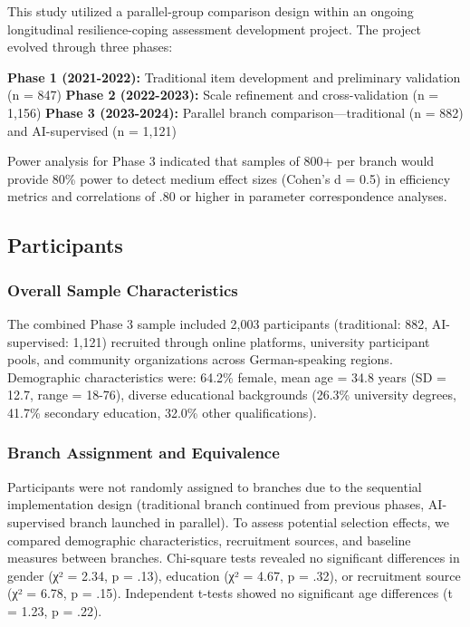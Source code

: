 \documentclass[12pt,a4paper]{article}
\begin{document}
This study utilized a parallel-group comparison design within an ongoing longitudinal resilience-coping assessment development project. The project evolved through three phases:

\textbf{Phase 1 (2021-2022):} Traditional item development and preliminary validation (n = 847)
\textbf{Phase 2 (2022-2023):} Scale refinement and cross-validation (n = 1,156) 
\textbf{Phase 3 (2023-2024):} Parallel branch comparison—traditional (n = 882) and AI-supervised (n = 1,121)

Power analysis for Phase 3 indicated that samples of 800+ per branch would provide 80\% power to detect medium effect sizes (Cohen's d = 0.5) in efficiency metrics and correlations of .80 or higher in parameter correspondence analyses.

\subsection{Participants}

\subsubsection{Overall Sample Characteristics}

The combined Phase 3 sample included 2,003 participants (traditional: 882, AI-supervised: 1,121) recruited through online platforms, university participant pools, and community organizations across German-speaking regions. Demographic characteristics were: 64.2\% female, mean age = 34.8 years (SD = 12.7, range = 18-76), diverse educational backgrounds (26.3\% university degrees, 41.7\% secondary education, 32.0\% other qualifications).

\subsubsection{Branch Assignment and Equivalence}

Participants were not randomly assigned to branches due to the sequential implementation design (traditional branch continued from previous phases, AI-supervised branch launched in parallel). To assess potential selection effects, we compared demographic characteristics, recruitment sources, and baseline measures between branches. Chi-square tests revealed no significant differences in gender (χ² = 2.34, p = .13), education (χ² = 4.67, p = .32), or recruitment source (χ² = 6.78, p = .15). Independent t-tests showed no significant age differences (t = 1.23, p = .22).
\end{document}
